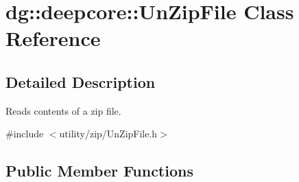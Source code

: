 \hypertarget{classdg_1_1deepcore_1_1_un_zip_file}{}\section{dg\+:\+:deepcore\+:\+:Un\+Zip\+File Class Reference}
\label{classdg_1_1deepcore_1_1_un_zip_file}


\subsection{Detailed Description}
Reads contents of a zip file. 

{\ttfamily \#include $<$utility/zip/\+Un\+Zip\+File.\+h$>$}

\subsection*{Public Member Functions}
